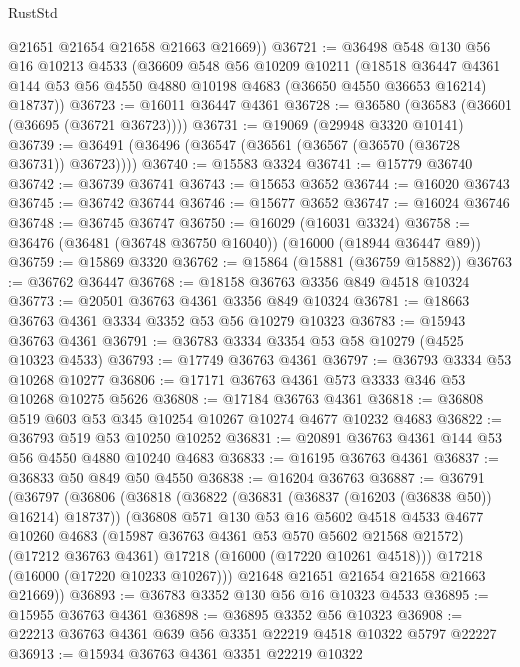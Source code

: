 \begin{lexlean}{RustStd}
\begin{coremodule}
        @21651
        @21654
        @21658
        @21663
        @21669))
@36721 := @36498
    @548
    @130
    @56
    @16
    @10213
    @4533
    (@36609
      @548
      @56
      @10209
      @10211
      (@18518
        @36447
        @4361
        @144
        @53
        @56
        @4550
        @4880
        @10198
        @4683
        (@36650 @4550 @36653 @16214)
        @18737))
@36723 := @16011 @36447 @4361
@36728 := @36580 (@36583 (@36601 (@36695 (@36721 @36723))))
@36731 := @19069 (@29948 @3320 @10141)
@36739 := @36491 (@36496 (@36547 (@36561 (@36567 (@36570 (@36728 @36731)) @36723))))
@36740 := @15583 @3324
@36741 := @15779 @36740
@36742 := @36739 @36741
@36743 := @15653 @3652
@36744 := @16020 @36743
@36745 := @36742 @36744
@36746 := @15677 @3652
@36747 := @16024 @36746
@36748 := @36745 @36747
@36750 := @16029 (@16031 @3324)
@36758 := @36476 (@36481 (@36748 @36750 @16040)) (@16000 (@18944 @36447 @89))
@36759 := @15869 @3320
@36762 := @15864 (@15881 (@36759 @15882))
@36763 := @36762 @36447
@36768 := @18158 @36763 @3356 @849 @4518 @10324
@36773 := @20501 @36763 @4361 @3356 @849 @10324
@36781 := @18663 @36763 @4361 @3334 @3352 @53 @56 @10279 @10323
@36783 := @15943 @36763 @4361
@36791 := @36783 @3334 @3354 @53 @58 @10279 (@4525 @10323 @4533)
@36793 := @17749 @36763 @4361
@36797 := @36793 @3334 @53 @10268 @10277
@36806 := @17171 @36763 @4361 @573 @3333 @346 @53 @10268 @10275 @5626
@36808 := @17184 @36763 @4361
@36818 := @36808 @519 @603 @53 @345 @10254 @10267 @10274 @4677 @10232 @4683
@36822 := @36793 @519 @53 @10250 @10252
@36831 := @20891 @36763 @4361 @144 @53 @56 @4550 @4880 @10240 @4683
@36833 := @16195 @36763 @4361
@36837 := @36833 @50 @849 @50 @4550
@36838 := @16204 @36763
@36887 := @36791
    (@36797
      (@36806
        (@36818
          (@36822 (@36831 (@36837 (@16203 (@36838 @50)) @16214) @18737))
          (@36808
            @571
            @130
            @53
            @16
            @5602
            @4518
            @4533
            @4677
            @10260
            @4683
            (@15987 @36763 @4361 @53 @570 @5602 @21568 @21572)
            (@17212 @36763 @4361)
            @17218
            (@16000 (@17220 @10261 @4518)))
          @17218
          (@16000 (@17220 @10233 @10267)))
        @21648
        @21651
        @21654
        @21658
        @21663
        @21669))
@36893 := @36783 @3352 @130 @56 @16 @10323 @4533
@36895 := @15955 @36763 @4361
@36898 := @36895 @3352 @56 @10323
@36908 := @22213 @36763 @4361 @639 @56 @3351 @22219 @4518 @10322 @5797 @22227
@36913 := @15934 @36763 @4361 @3351 @22219 @10322

\end{coremodule}
\end{lexlean}
